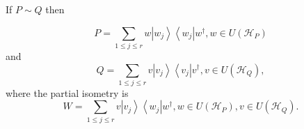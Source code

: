 \documentclass{article}
\begin{document}
If $P\sim Q$ then 

\begin{equation}
P=\sum_{1\leq j\leq r}w\left\vert w_{j}\right\rangle \left\langle
w_{j}\right\vert w^{\dagger },w\in U\left( \mathcal{H}_{P}\right) 
\end{equation}%
and 
\begin{equation}
Q=\sum_{1\leq j\leq r}v\left\vert v_{j}\right\rangle \left\langle
v_{j}\right\vert v^{\dagger },v\in U\left( \mathcal{H}_{Q}\right) ,
\end{equation}%
where the partial isometry is 
\begin{equation}
W=\sum_{1\leq j\leq r}v\left\vert v_{j}\right\rangle \left\langle
w_{j}\right\vert w^{\dagger },w\in U\left( \mathcal{H}_{P}\right) ,v\in
U\left( \mathcal{H}_{Q}\right) .
\end{equation}
\end{document}
